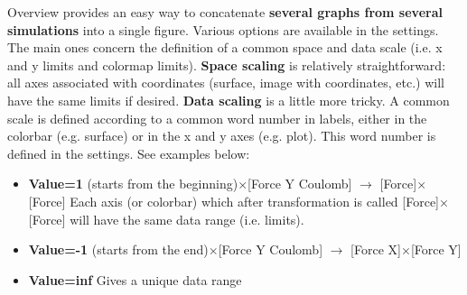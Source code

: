 \documentclass{article}
\begin{document}
Overview provides an easy way to concatenate \textbf{several graphs from several simulations} into a single figure. Various options are available in the settings. The main ones concern the definition of a common space and data scale (i.e. x and y limits and colormap limits). \textbf{Space scaling} is relatively straightforward: all axes associated with coordinates (surface, image with coordinates, etc.) will have the same limits if desired. \textbf{Data scaling} is a little more tricky. A common scale is defined according to a common word number in labels, either in the colorbar (e.g. surface) or in the x and y axes (e.g. plot). This word number is defined in the settings. See examples below:
\begin{itemize}
\item \textbf{Value=1} (starts from the beginning)$\times$[Force Y Coulomb] $\rightarrow$ [Force]$\times$[Force]\newline
Each axis (or colorbar) which after transformation is called [Force]$\times$[Force] will have the same data range (i.e. limits).
\item \textbf{Value=-1} (starts from the end)$\times$[Force Y Coulomb] $\rightarrow$ [Force X]$\times$[Force Y]
\item \textbf{Value=inf}\newline
Gives a unique data range
\end{itemize}
\end{document}
